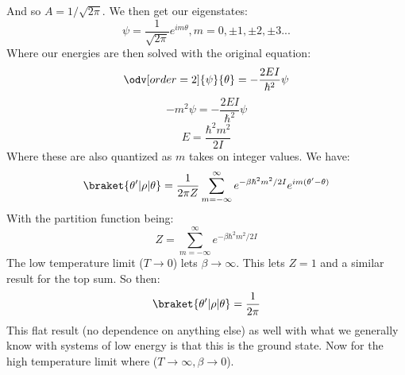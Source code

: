 And so $A = 1/\sqrt{2\pi}$. We then get our eigenstates:
\begin{equation}
    \psi = \frac{1}{\sqrt{2\pi}}e^{im\theta}, m = 0, \pm 1, \pm 2,\pm3...
\end{equation}
Where our energies are then solved with the original equation:
\begin{equation}
    \odv[order=2]{\psi}{\theta} = -\frac{2EI}{\hbar^2}\psi
\end{equation}
\begin{equation}
    -m^2\psi = -\frac{2EI}{\hbar^2}\psi
\end{equation}
\begin{equation}
    E = \frac{\hbar^2m^2}{2I}
\end{equation}
Where these are also quantized as $m$ takes on integer values.
We have:
\begin{equation}
    \braket{\theta'|\rho|\theta} = \frac{1}{2\pi Z}\sum_{m=-\infty}^{\infty}e^{-\beta \hbar^2 m^2/2I}e^{im(\theta' - \theta)}
\end{equation}
With the partition function being:
\begin{equation}
    Z = \sum_{m = -\infty}^{\infty}e^{-\beta \hbar^2m^2/2I}
\end{equation}
The low temperature limit ($T \rightarrow 0$) lets $\beta \rightarrow \infty$. This lets $Z = 1$ and a similar result for the top sum. So then:
\begin{equation}
    \braket{\theta'|\rho|\theta} = \frac{1}{2\pi}
\end{equation}
This flat result (no dependence on anything else) as well with what we generally know with systems of low energy is that this is the ground state. Now for the high temperature limit where ($T\rightarrow\infty, \beta\rightarrow 0$).